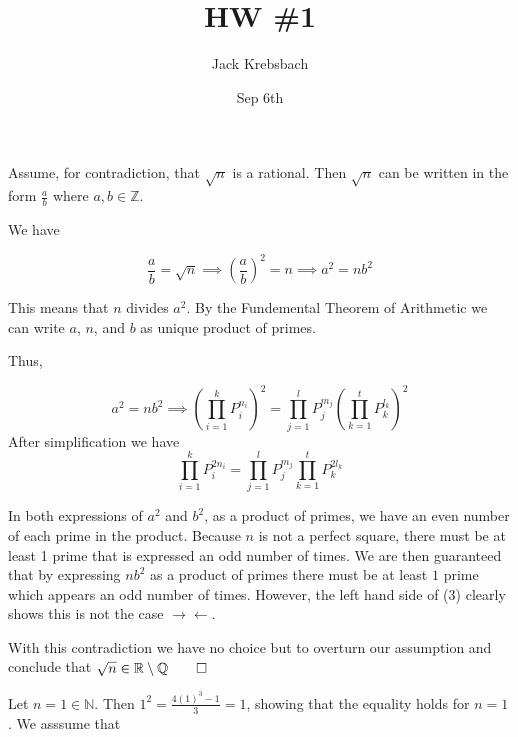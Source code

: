 \documentclass{report}
\title{HW \#1}
\author{Jack Krebsbach }
\date{Sep 6th}
\begin{document}
\maketitle

\sol Assume, for contradiction, that $\sqrt{n}$ is a rational. Then $\sqrt{n}$ can be written in the form $\frac{a}{b}$ where $a,b \in \mathbb{Z}$.

We have 


\begin{equation}
  \frac{a}{b} = \sqrt{n} \implies
  \left(\frac{a}{b}\right)^{2} = n \implies a^2 = n b^2
\end{equation}


This means that $n$ divides $a^{2}$. 
By the Fundemental Theorem of Arithmetic we can write $a$, $n$, and $b$ as  unique product of primes. 

Thus, 

\begin{equation}
 a^2 = n b^2 \implies
 \left(\prod^{k}_{i = 1} P_{i}^{n_i}\right)^2  = \prod_{j = 1}^{l} P_{j}^{m_j}\left(\prod^{t}_{k = 1} P_{k}^{l_k}\right)^2 
\end{equation}
After simplification we have
\begin{equation}
     \prod^{k}_{i = 1} P_{i}^{2n_i}  = \prod_{j = 1}^{l} P_{j}^{m_j}\prod^{t}_{k = 1} P_{k}^{2l_k}
\end{equation}


In both expressions of $a^2$ and $b^2$, as a product of primes, we have an even number of each prime in the product. Because $n$ is not a perfect square, there must be at least 1 prime that is expressed an odd number of times. We are then guaranteed that by expressing $nb^2$ as a product of primes there must be at least $1$ prime which appears an odd number of times. However, the left hand side of (3) clearly shows this is not the case $\rightarrow\!\leftarrow.$

With this contradiction we have no choice but to overturn our assumption and conclude that $\sqrt{n} \in \mathbb{R} \setminus \mathbb{Q} \qed$

\bigskip
{}
\sol

Let $n=1 \in \mathbb{N}$. Then $1^2 =  \frac{4 (1)^{3}-1}{3} = 1$, showing that the equality holds for $n=1$. We asssume that 
\end{document}
